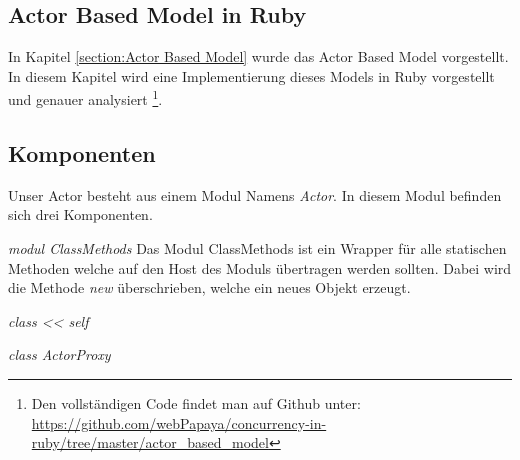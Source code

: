 \subsection{Actor Based Model in Ruby}

In Kapitel \ref{section:Actor Based Model} wurde das Actor Based Model vorgestellt. In diesem Kapitel wird eine Implementierung dieses Models in Ruby vorgestellt und genauer analysiert \footnote{Den vollständigen Code findet man auf Github unter: \url{https://github.com/webPapaya/concurrency-in-ruby/tree/master/actor_based_model}}. 



\subsection{Komponenten}

Unser Actor besteht aus einem Modul Namens \emph{Actor}. In diesem Modul befinden sich drei Komponenten.

\emph{modul ClassMethods}
Das Modul ClassMethods ist ein Wrapper für alle statischen Methoden welche auf den Host des Moduls übertragen werden sollten. Dabei wird die Methode \emph{new} überschrieben, welche ein neues Objekt erzeugt.  

\emph{class << self}



\emph{class ActorProxy}
